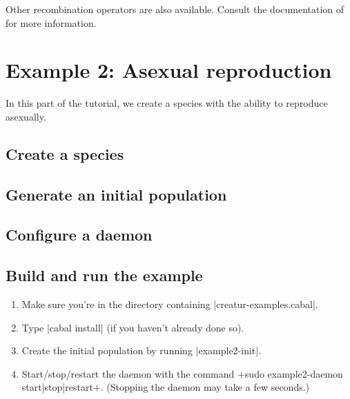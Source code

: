 \documentclass[a4paper,10pt]{report}
\begin{document}
Other recombination operators are also available.
Consult the documentation of 
for more information.

\section{Example 2: Asexual reproduction}
\label{sec:plant}

In this part of the tutorial, we create a species with the
ability to reproduce asexually.

\subsection{Create a species}
\label{sec:species2}



\subsection{Generate an initial population}
\label{sec:pop2}



\subsection{Configure a daemon}
\label{sec:daemon2}



\subsection{Build and run the example}
\label{sec:run2}

\begin{enumerate}
\item Make sure you're in the directory containing |creatur-examples.cabal|.
\item Type |cabal install| (if you haven't already done so).
\item Create the initial population by running |example2-init|.
\item Start/stop/restart the daemon with the command
\UndefineShortVerb{\|}
\DefineShortVerb{\+}
+sudo example2-daemon start|stop|restart+.
\UndefineShortVerb{\+}
\DefineShortVerb{\|}
(Stopping the daemon may take a few seconds.)
\end{enumerate}
\end{document}
